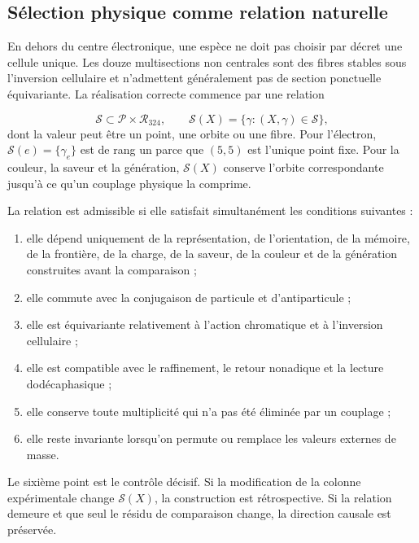 \subsection{Sélection physique comme relation naturelle}
En dehors du centre électronique, une espèce ne doit pas choisir par décret une cellule unique. Les douze multisections non centrales sont des fibres stables sous l’inversion cellulaire et n’admettent généralement pas de section ponctuelle équivariante. La réalisation correcte commence par une relation

\[
\mathscr S\subset \mathcal P\times\mathcal R_{324},
\qquad
\mathscr S(X)=\{\gamma:(X,\gamma)\in\mathscr S\},
\]
dont la valeur peut être un point, une orbite ou une fibre. Pour l’électron, \(\mathscr S(e)=\{\gamma_e\}\) est de rang un parce que \((5,5)\) est l’unique point fixe. Pour la couleur, la saveur et la génération, \(\mathscr S(X)\) conserve l’orbite correspondante jusqu’à ce qu’un couplage physique la comprime.

La relation est admissible si elle satisfait simultanément les conditions suivantes :

\begin{enumerate}
\item elle dépend uniquement de la représentation, de l’orientation, de la mémoire, de la frontière, de la charge, de la saveur, de la couleur et de la génération construites avant la comparaison ;

\item elle commute avec la conjugaison de particule et d’antiparticule ;
\item elle est équivariante relativement à l’action chromatique et à l’inversion cellulaire ;
\item elle est compatible avec le raffinement, le retour nonadique et la lecture dodécaphasique ;
\item elle conserve toute multiplicité qui n’a pas été éliminée par un couplage ;
\item elle reste invariante lorsqu’on permute ou remplace les valeurs externes de masse.
\end{enumerate}
Le sixième point est le contrôle décisif. Si la modification de la colonne expérimentale change \(\mathscr S(X)\), la construction est rétrospective. Si la relation demeure et que seul le résidu de comparaison change, la direction causale est préservée.

